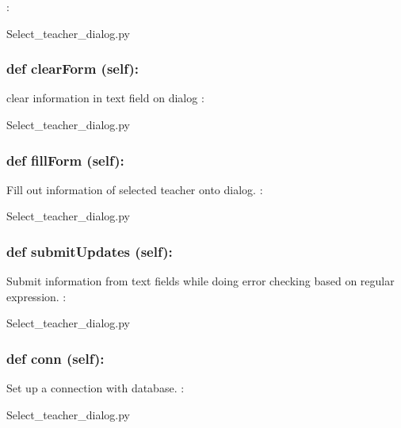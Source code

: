 :\begin{DoxyCompactItemize}
\item 
Select\_teacher\_dialog.\-py\end{DoxyCompactItemize}

\hypertarget{class_poly_a14a7ad77ce612b0c54f531d307ee4b39}{
\subsubsection[{def clearForm (self):}]{\setlength{\rightskip}{0pt plus 5cm}def {clearForm} (self):}}\label{class_poly_a14a7ad77ce612b0c54f531d307ee4b39}
clear information in text field on dialog 
:\begin{DoxyCompactItemize}
\item 
Select\_teacher\_dialog.\-py\end{DoxyCompactItemize}

\hypertarget{class_poly_a14a7ad77ce612b0c54f531d307ee4b39}{
\subsubsection[{def fillForm (self):}]{\setlength{\rightskip}{0pt plus 5cm}def {fillForm} (self):}}\label{class_poly_a14a7ad77ce612b0c54f531d307ee4b39}
Fill out information of selected teacher onto dialog.
:\begin{DoxyCompactItemize}
\item 
Select\_teacher\_dialog.\-py\end{DoxyCompactItemize}

\hypertarget{class_poly_a14a7ad77ce612b0c54f531d307ee4b39}{
\subsubsection[{def submitUpdates (self):}]{\setlength{\rightskip}{0pt plus 5cm}def {submitUpdates} (self):}}\label{class_poly_a14a7ad77ce612b0c54f531d307ee4b39}
Submit information from text fields while doing error checking based on regular expression.
:\begin{DoxyCompactItemize}
\item 
Select\_teacher\_dialog.\-py\end{DoxyCompactItemize}

\hypertarget{class_poly_a14a7ad77ce612b0c54f531d307ee4b39}{
\subsubsection[{def conn (self):}]{\setlength{\rightskip}{0pt plus 5cm}def {conn} (self):}}\label{class_poly_a14a7ad77ce612b0c54f531d307ee4b39}
Set up a connection with database.
:\begin{DoxyCompactItemize}
\item 
Select\_teacher\_dialog.\-py\end{DoxyCompactItemize}

